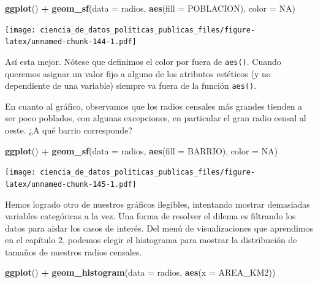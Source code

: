 \documentclass[]{book}
\newenvironment{Shaded}{\begin{snugshade}}{\end{snugshade}}
\newcommand{\KeywordTok}[1]{\textcolor[rgb]{0.13,0.29,0.53}{\textbf{#1}}}
\newcommand{\DataTypeTok}[1]{\textcolor[rgb]{0.13,0.29,0.53}{#1}}
\newcommand{\StringTok}[1]{\textcolor[rgb]{0.31,0.60,0.02}{#1}}
\newcommand{\OtherTok}[1]{\textcolor[rgb]{0.56,0.35,0.01}{#1}}
\newcommand{\OperatorTok}[1]{\textcolor[rgb]{0.81,0.36,0.00}{\textbf{#1}}}
\newcommand{\NormalTok}[1]{#1}
\begin{document}
\begin{Shaded}
\begin{Highlighting}[]
\KeywordTok{ggplot}\NormalTok{() }\OperatorTok{+}\StringTok{ }\KeywordTok{geom_sf}\NormalTok{(}\DataTypeTok{data =}\NormalTok{ radios, }\KeywordTok{aes}\NormalTok{(}\DataTypeTok{fill =}\NormalTok{ POBLACION), }\DataTypeTok{color =} \OtherTok{NA}\NormalTok{)}
\end{Highlighting}
\end{Shaded}

\texttt{[image: ciencia\_de\_datos\_politicas\_publicas\_files/figure-latex/unnamed-chunk-144-1.pdf]}

Así esta mejor. Nótese que definimos el color por fuera de
\texttt{aes()}. Cuando queremos asignar un valor fijo a alguno de los
atributos estéticos (y no dependiente de una variable) siempre va fuera
de la función \texttt{aes()}.

En cuanto al gráfico, observamos que los radios censales más grandes
tienden a ser poco poblados, con algunas excepciones, en particular el
gran radio censal al oeste. ¿A qué barrio corresponde?

\begin{Shaded}
\begin{Highlighting}[]
\KeywordTok{ggplot}\NormalTok{() }\OperatorTok{+}\StringTok{ }\KeywordTok{geom_sf}\NormalTok{(}\DataTypeTok{data =}\NormalTok{ radios, }\KeywordTok{aes}\NormalTok{(}\DataTypeTok{fill =}\NormalTok{ BARRIO), }\DataTypeTok{color =} \OtherTok{NA}\NormalTok{)}
\end{Highlighting}
\end{Shaded}

\texttt{[image: ciencia\_de\_datos\_politicas\_publicas\_files/figure-latex/unnamed-chunk-145-1.pdf]}

Hemos logrado otro de nuestros gráficos ilegibles, intentando mostrar
demasiadas variables categóricas a la vez. Una forma de resolver el
dilema es filtrando los datos para aislar los casos de interés. Del menú
de visualizaciones que aprendimos en el capítulo 2, podemos elegir el
histograma para mostrar la distribución de tamaños de nuestros radios
censales.

\begin{Shaded}
\begin{Highlighting}[]
\KeywordTok{ggplot}\NormalTok{() }\OperatorTok{+}\StringTok{ }\KeywordTok{geom_histogram}\NormalTok{(}\DataTypeTok{data =}\NormalTok{ radios, }\KeywordTok{aes}\NormalTok{(}\DataTypeTok{x =}\NormalTok{ AREA_KM2))}
\end{Highlighting}
\end{Shaded}
\end{document}

